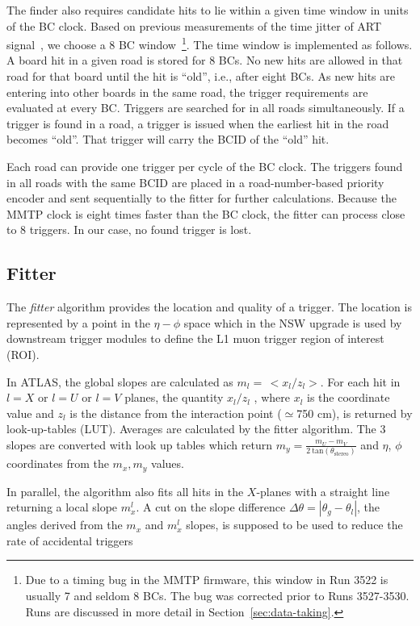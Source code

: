 The finder also requires candidate hits to lie within a given time window in units of the BC clock.
Based on previous measurements of the time jitter of ART signal~\cite{oldart}, we  choose a 8 BC window~\footnote{Due to a timing bug in 
the MMTP firmware, this window  in Run 3522 is usually 7 and seldom 8 BCs. The bug was corrected prior to Runs 3527-3530. Runs are discussed 
in more detail in Section~\ref{sec:data-taking}.}.
 The time window is implemented as follows. A board hit in a given road is stored  for 8 BCs.
 No new hits are allowed in that road for that board until the hit is ``old'', i.e., after eight BCs.
 As new hits are entering into other boards in the same road, the trigger requirements are evaluated at every BC.
 Triggers are searched for in all roads simultaneously. 
 If a trigger is found in a road,
 a trigger is issued when the earliest hit in the road becomes ``old''. That trigger will carry the BCID of the ``old'' hit.

Each road can provide  one trigger per cycle of the BC clock. The triggers
 found  in all roads with the same BCID are placed in a road-number-based priority encoder  and sent sequentially to the fitter for further calculations.
 Because the MMTP clock is eight times faster than the BC clock, the fitter can process close to 8 triggers.
 In our case,  no found trigger is lost.
\subsection{Fitter}
\label{sec:alg-fitter}
The  \textit{fitter} algorithm  provides the location and quality of a trigger.
The location is represented by a point in the  $\eta-\phi$ space which in the NSW upgrade is used by downstream
trigger modules to define the L1 muon trigger region of interest (ROI).

In ATLAS, the global slopes are calculated as  $m_l = \, <x_l/z_l> $. For each hit
  in $l=X$ or $l=U$ or $l=V$ planes, the quantity $x_l/z_l$ , where $x_l$ is the coordinate value
 and $z_l$ is the  distance  from the interaction point ($\simeq$750 cm), is returned by look-up-tables (LUT).
 Averages are calculated by the fitter algorithm.
The 3 slopes are converted with look up tables which 
 return  $m_y=\frac{m_U - m_V}{2\ \text{tan}(\theta_\text{stereo})}$ and $\eta$, $\phi$ coordinates from the $m_x,m_y$ values.

 In parallel,  the algorithm also fits  all hits in the $X$-planes with a straight line 
 returning a local slope $m_x^l$. A cut on the slope difference  $\Delta\theta = |\theta_g - \theta_l |$, the angles derived from
 the $m_x$ and $m_x^l$ slopes,  is supposed to be used to reduce the rate of accidental triggers 


